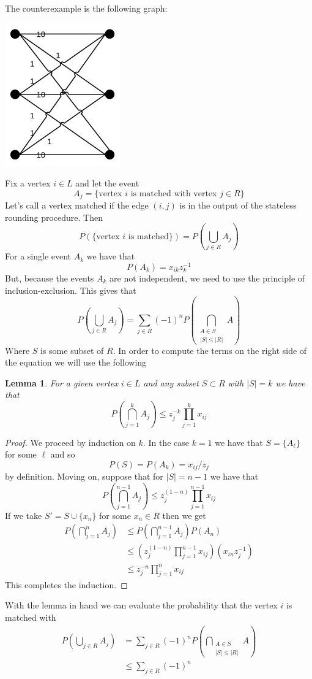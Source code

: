 \documentclass{article}
\newcommand{\problem}[1]{\noindent {\bf #1}}
\newcommand{\problempart}[1]{\noindent{\textbf{(#1)}}}
\newtheorem*{lem}{Lemma}
\begin{document}
\problem{Problem 1.} The counterexample is the following graph:

\includegraphics[width=50mm]{grapha.png}


\problem{Problem 4.} 
\problempart{a} Fix a vertex $i \in L$ and let the event
\[
A_j = \{\text{vertex } i \text{ is matched with vertex } j \in R\}
\] 
Let's call a vertex matched if the edge $(i,j)$ is in the output of the stateless rounding procedure. Then 
\[
P(\{\text{vertex } i \text{ is matched}\}) = P( \bigcup_{j\in R} A_j )
\]
For a single event $A_k$ we have that 
\[
P(A_k) = x_{ik}z_k^{-1}
\]
But, because the events $A_k$ are not independent, we need to use the principle of inclusion-exclusion. This gives that
\[
P( \bigcup_{j\in R} A_j ) = \sum_{j \in R} (-1)^nP(\bigcap_{\substack{A \in S \\ |S| \leq |R| }}A)
\]
Where $S$ is some subset of $R$. In order to compute the terms on the right side of the equation we will use the following \\
\begin{lem}
For a given vertex $i \in L$ and any subset $S \subset R$ with $|S| = k$ we have that 
\[
P(\bigcap_{j=1}^k A_j) \leq z_j^{-k}\prod_{j=1}^k x_{ij}
\]
\end{lem}
\begin{proof}
We proceed by induction on $k$. In the case $k=1$ we have that $S = \{A_\ell\}$ for some $\ell$ and so 
\[
P(S) = P(A_k) = x_{ij}/z_j 
\]
by definition. Moving on, suppose that for $|S| = n-1$ we have that 
\[
P(\bigcap_{j=1}^{n-1} A_j) \leq z_j^{(1-n)} \prod_{j=1}^{n-1}x_{ij}
\] 
If we take $S' = S \cup \{x_n\}$ for some $x_n \in R$ then we get
\begin{align*}
P(\bigcap_{j=1}^{n} A_j) &\leq P(\bigcap_{j=1}^{n-1} A_j)P(A_n) \\
&\leq \left(z_j^{(1-n)} \prod_{j=1}^{n-1}x_{ij}\right)(x_{in}z_j^{-1}) \\
&\leq z_j^{-n}\prod_{j=1}^n x_{ij}
\end{align*}
This completes the induction.
\end{proof}
With the lemma in hand we can evaluate the probability that the vertex $i$ is matched with 
\begin{align*}
P( \bigcup_{j\in R} A_j ) &= \sum_{j \in R} (-1)^nP(\bigcap_{\substack{A \in S \\ |S| \leq |R| }}A) \\
&\leq \sum_{j \in R} (-1)^n 
\end{align*}
\end{document}
